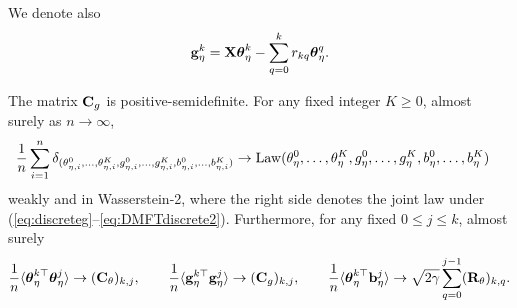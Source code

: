 We denote also
\begin{equation}\label{eq:discretegk}
\mathbf{g}^{k}_\eta = \mathbf{X} \boldsymbol{\theta}^{k}_\eta - \sum_{q=0}^k r_{kq} \boldsymbol{\theta}^{q}_\eta.
\end{equation}

\begin{theorem}\label{thm:discreteDMFT}
The matrix $\mathbf{C}_g$ is positive-semidefinite. 
For any fixed integer $K \ge 0$, almost surely as $n \to \infty$,
\begin{align}\label{eq:AMP-SE}
&\frac{1}{n}\sum_{i=1}^n
\delta_{(\theta^{0}_{\eta,i},\ldots,\theta^{K}_{\eta,i},g^{0}_{\eta,i},\ldots,g^{K}_{\eta,i},b^{0}_{\eta,i},\ldots,b^{K}_{\eta,i})}
\to \operatorname{Law}(\theta^{0}_\eta,\ldots,\theta^{K}_\eta, g^{0}_\eta,\ldots,g^{K}_\eta,
b^{0}_\eta,\ldots,b^{K}_\eta)
\end{align}
weakly and in Wasserstein-2, where the right side denotes the joint law under
(\ref{eq:discreteg}--\ref{eq:DMFTdiscrete2}). Furthermore,
for any fixed $0 \leq j \leq k$, almost surely
\begin{equation}\label{eq:discretekernelconvergence}
\frac{1}{n}\langle \boldsymbol{\theta}_\eta^{k\top}\boldsymbol{\theta}_\eta^j \rangle
\to (\mathbf{C}_\theta)_{k,j},
\qquad \frac{1}{n}\langle \mathbf{g}_\eta^{k\top}\mathbf{g}_\eta^j \rangle
\to (\mathbf{C}_g)_{k,j},
\qquad
\frac{1}{n}\langle \boldsymbol{\theta}_\eta^{k\top}
\mathbf{b}_\eta^j \rangle \to \sqrt{2\gamma}\sum_{q=0}^{j-1}(\mathbf{R}_\theta)_{k,q}.
\end{equation}
\end{theorem}

